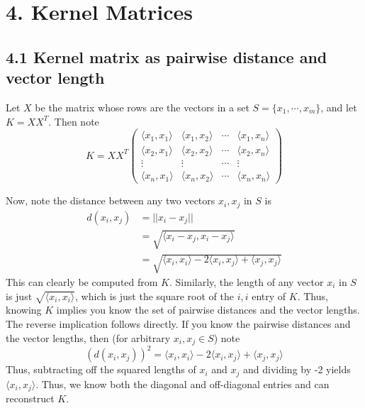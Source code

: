 \documentclass[paper=a4, fontsize=11pt]{scrartcl} %
\numberwithin{equation}{section} %
\numberwithin{figure}{section} %
\numberwithin{table}{section} %
\begin{document}

\section*{4. Kernel Matrices}
\subsection*{4.1 Kernel matrix as pairwise distance and vector length}

Let $X$ be the matrix whose rows are the vectors in a set $S = \{x_1, \cdots, x_m\}$, and let $K = XX^T$. Then note
\[
K = X X^T
\left(
\begin{matrix}
	\langle x_1, x_1 \rangle & \langle x_1, x_2 \rangle & \cdots & \langle x_1, x_n \rangle \\
	\langle x_2, x_1 \rangle & \langle x_2, x_2 \rangle & \cdots & \langle x_2, x_n \rangle \\
	\vdots & \vdots & \cdots & \vdots \\
	\langle x_n, x_1 \rangle & \langle x_n, x_2 \rangle & \cdots & \langle x_n, x_n \rangle
\end{matrix}
\right)
\]

Now, note the distance between any two vectors $x_i, x_j$ in $S$ is
\begin{align*}
d(x_i, x_j) &= ||x_i - x_j|| \\
	&= \sqrt{\langle x_i - x_j, x_i - x_j \rangle} \\
	&=  \sqrt{\langle x_i, x_i \rangle -2 \langle x_i, x_j \rangle + \langle x_j, x_j \rangle}
\end{align*}
This can clearly be computed from $K$.
Similarly, the length of any vector $x_i$ in $S$ is just $\sqrt{\langle x_i, x_i \rangle}$, which is just the square root of the $i, i$ entry of $K$. Thus, knowing $K$ implies you know the set of pairwise distances and the vector lengths.\\

The reverse implication follows directly. If you know the pairwise distances and the vector lengths, then (for arbitrary $x_i, x_j \in S$) note
\[\left(d(x_i, x_j)\right)^2 = \langle x_i, x_i \rangle -2 \langle x_i, x_j \rangle + \langle x_j, x_j \rangle\]
Thus, subtracting off the squared lengths of $x_i$ and $x_j$ and dividing by -2 yields  $\langle x_i, x_j \rangle$. Thus, we know both the diagonal and off-diagonal entries and can reconstruct $K$.
\end{document}
